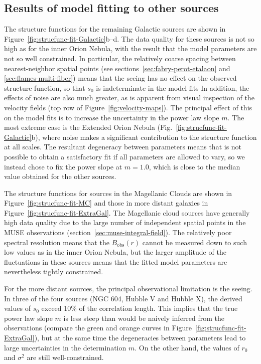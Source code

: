 \documentclass[fleqn,usenatbib, useAMS, a4paper]{mnras}
\newcommand\obs{\ensuremath{_{\mathrm{obs}}}}
\begin{document}
\subsection{Results of model fitting to other sources}
\label{sec:results-model-fitt}

The structure functions for the remaining Galactic sources
are shown in Figure~\ref{fig:strucfunc-fit-Galactic}b--d.
The data quality for these sources is not so high as for the inner Orion Nebula,
with the result that the model parameters are not so well constrained.
In particular, the relatively coarse spacing between nearest-neighbor spatial points
(see sections~\ref{sec:fabry-perot-etalaon} and \ref{sec:flames-multi-fiber})
means that the seeing has no effect on the observed structure function,
so that \(s_0\) is indeterminate in the model fits
In addition, the effects of noise are also much greater,
as is apparent from visual inspection of the velocity fields
(top row of Figure~\ref{fig:velocity-maps}).
The principal effect of this on the model fits is to increase the uncertainty
in the power law slope \(m\).
The most extreme case is the Extended Orion Nebula (Fig.~\ref{fig:strucfunc-fit-Galactic}b),
where noise makes a significant contribution to the structure function at all scales.
The resultant degeneracy between parameters means that
is not possible to obtain a satisfactory fit
if all parameters are allowed to vary,
so we instead chose to fix the power slope at \(m = 1.0\),
which is close to the median value obtained for the other sources.

The structure functions for sources in the Magellanic Clouds are shown in Figure~\ref{fig:strucfunc-fit-MC}
and those in more distant galaxies in Figure~\ref{fig:strucfunc-fit-ExtraGal}.
The Magellanic cloud sources have generally high data quality due to the
large number of independent spatial points in the MUSE observations
(section~\ref{sec:muse-integral-field}).
The relatively poor spectral resolution means that the \(B\obs(r)\) cannot
be measured down to such low values as in the inner Orion Nebula,
but the larger amplitude of the fluctuations in these sources means
that the fitted model parameters are nevertheless tightly constrained.

For the more distant sources, the principal observational limitation is the seeing.
In three of the four sources (NGC 604, Hubble V and Hubble X),
the derived values of \(s_0\) exceed 10\% of the correlation length.
This implies that the true power law slope \(m\) is less steep than
would be naively inferred from the observations
(compare the green and orange curves in Figure~\ref{fig:strucfunc-fit-ExtraGal}),
but at the same time the degeneracies between parameters
lead to large uncertainties in the determination \(m\).
On the other hand, the values of \(r_0\) and \(\sigma^2\) are still well-constrained.
\end{document}

